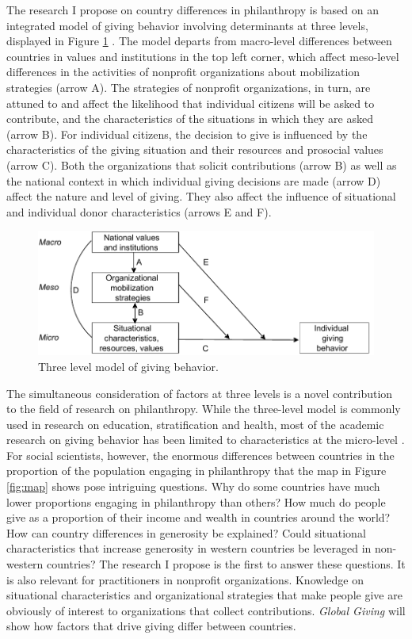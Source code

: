 \documentclass[twocolumn, serif, rga, numeric]{jote-article}
\begin{document}
The research I propose on country differences in philanthropy is based on an integrated model of giving behavior involving determinants at three levels, displayed in Figure \ref{fig:lobster} \cite{Penner2005}. The model departs from macro-level differences between countries in values and institutions in the top left corner, which affect meso-level differences in the activities of nonprofit organizations about mobilization strategies (arrow A). The strategies of nonprofit organizations, in turn, are attuned to and affect the likelihood that individual citizens will be asked to contribute, and the characteristics of the situations in which they are asked (arrow B). For individual citizens, the decision to give is influenced by the characteristics of the giving situation and their resources and prosocial values (arrow C). Both the organizations that solicit contributions (arrow B) as well as the national context in which individual giving decisions are made (arrow D) affect the nature and level of giving. They also affect the influence of situational and individual donor characteristics (arrows E and F).
\begin{figure}
    \centering
    \includegraphics[width=\columnwidth]{articles/RGAs/bekkers/lobster.pdf}
    \caption{Three level model of giving behavior.}
    \label{fig:lobster}
\end{figure}


The simultaneous consideration of factors at three levels is a novel contribution to the field of research on philanthropy. While the three-level model is commonly used in research on education, stratification and health, most of the academic research on giving behavior has been limited to characteristics at the micro-level \cite{Bekkers2007, Bekkers2016a}. For social scientists, however, the enormous differences between countries in the proportion of the population engaging in philanthropy that the map in Figure \ref{fig:map} shows pose intriguing questions. Why do some countries have much lower proportions engaging in philanthropy than others? How much do people give as a proportion of their income and wealth in countries around the world? How can country differences in generosity be explained? Could situational characteristics that increase generosity in western countries be leveraged in non-western countries? The research I propose is the first to answer these questions. It is also relevant for practitioners in nonprofit organizations. Knowledge on situational characteristics and organizational strategies that make people give are obviously of interest to organizations that collect contributions.
\emph{Global Giving} will show how factors that drive giving differ between countries.
\end{document}
